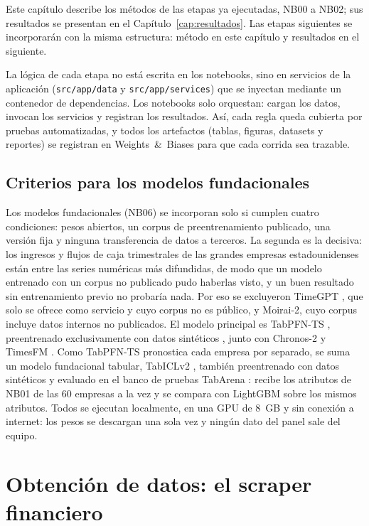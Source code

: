 \documentclass[12pt,letterpaper,oneside]{report}
\renewcommand{\_}{\UnderscoreOriginal\allowbreak}
\begin{document}
Este capítulo describe los métodos de las etapas ya ejecutadas, NB00 a NB02; sus resultados se presentan en el Capítulo~\ref{cap:resultados}. Las etapas siguientes se incorporarán con la misma estructura: método en este capítulo y resultados en el siguiente.

La lógica de cada etapa no está escrita en los notebooks, sino en servicios de la aplicación (\texttt{src/app/data} y \texttt{src/app/services}) que se inyectan mediante un contenedor de dependencias. Los notebooks solo orquestan: cargan los datos, invocan los servicios y registran los resultados. Así, cada regla queda cubierta por pruebas automatizadas, y todos los artefactos (tablas, figuras, datasets y reportes) se registran en Weights~\&~Biases para que cada corrida sea trazable.

\subsection{Criterios para los modelos fundacionales}
\label{sec:fundacionales}

Los modelos fundacionales (NB06) se incorporan solo si cumplen cuatro condiciones: pesos abiertos, un corpus de preentrenamiento publicado, una versión fija y ninguna transferencia de datos a terceros. La segunda es la decisiva: los ingresos y flujos de caja trimestrales de las grandes empresas estadounidenses están entre las series numéricas más difundidas, de modo que un modelo entrenado con un corpus no publicado pudo haberlas visto, y un buen resultado sin entrenamiento previo no probaría nada. Por eso se excluyeron TimeGPT \parencite{garza2023timegpt}, que solo se ofrece como servicio y cuyo corpus no es público, y Moirai-2, cuyo corpus incluye datos internos no publicados. El modelo principal es TabPFN-TS \parencite{hoo2025tabpfnts}, preentrenado exclusivamente con datos sintéticos \parencite{hollmann2025tabpfn}, junto con Chronos-2 \parencite{ansari2025chronos2} y TimesFM \parencite{das2024timesfm}. Como TabPFN-TS pronostica cada empresa por separado, se suma un modelo fundacional tabular, TabICLv2 \parencite{qu2026tabiclv2}, también preentrenado con datos sintéticos y evaluado en el banco de pruebas TabArena \parencite{erickson2025tabarena}: recibe los atributos de NB01 de las 60 empresas a la vez y se compara con LightGBM sobre los mismos atributos. Todos se ejecutan localmente, en una GPU de 8~GB y sin conexión a internet: los pesos se descargan una sola vez y ningún dato del panel sale del equipo.

\section{Obtención de datos: el scraper financiero}
\label{sec:scraper}
\end{document}
